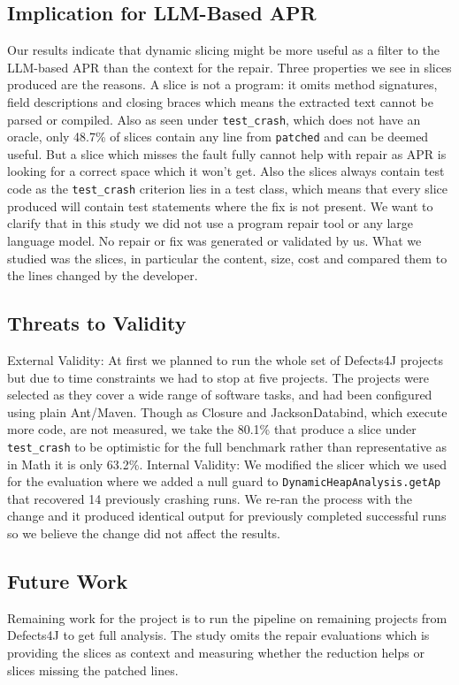 \documentclass[sigconf,nonacm]{acmart}
\begin{document}
\subsection{Implication for LLM-Based APR}
Our results indicate that dynamic slicing might be more useful as a filter to the LLM-based APR than the context for the repair. Three properties we see in slices produced are the reasons. A slice is not a program: it omits method signatures, field descriptions and closing braces which means the extracted text cannot be parsed or compiled. Also as seen under \texttt{test\_crash}, which does not have an oracle, only 48.7\% of slices contain any line from \texttt{patched} and can be deemed useful.
But a slice which misses the fault fully cannot help with repair as APR is looking for a correct space which it won't get.
Also the slices always contain test code as the \texttt{test\_crash} criterion lies in a test class, which means that every slice produced will contain test statements where the fix is not present.
We want to clarify that in this study we did not use a program repair tool or any large language model. No repair or fix was generated or validated by us. What we studied was the slices, in particular the content, size, cost and compared them to the lines changed by the developer.

\subsection{Threats to Validity}
External Validity: At first we planned to run the whole set of Defects4J projects but due to time constraints we had to stop at five projects. The projects were selected as they cover a wide range of software tasks, and had been configured using plain Ant/Maven. Though as Closure and JacksonDatabind, which execute more code, are not measured, we take the 80.1\% that produce a slice under \texttt{test\_crash} to be optimistic for the full benchmark rather than representative as in Math it is only 63.2\%.
Internal Validity: We modified the slicer which we used for the evaluation where we added a null guard to \texttt{DynamicHeapAnalysis.getAp} that recovered 14 previously crashing runs. We re-ran the process with the change and it produced identical output for previously completed successful runs so we believe the change did not affect the results.

\subsection{Future Work}
Remaining work for the project is to run the pipeline on remaining projects from Defects4J to get full analysis. The study omits the repair evaluations which is providing the slices as context and measuring whether the reduction helps or slices missing the patched lines.
\end{document}
